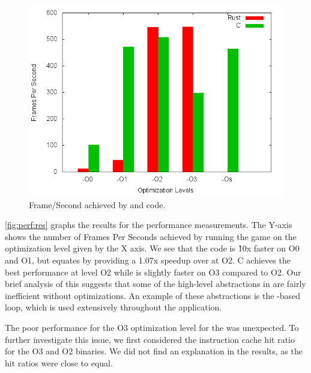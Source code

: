 \begin{figure}[H]
  \begin{center}
    \includegraphics[scale=0.5]{results/plots/perf/perf.png}
  \end{center}
  \caption{Frame/Second achieved by {\rust} and {\C} code.}
  \label{fig:perf:res}
\end{figure}

\autoref{fig:perf:res} graphs the results for the performance measurements.
The Y-axis shows the number of Frames Per Seconds achieved by running the game on the optimization level given by the X axis.
We see that the {\C} code is \~10x faster on O0 and O1, but {\rust} equates by providing a 1.07x speedup over {\C} at O2.
C achieves the best performance at level O2 while {\rust} is slightly faster on O3 compared to O2.
Our brief analysis of this suggests that some of the high-level abstractions in {\rust} are fairly inefficient without optimizations.
An example of these abstractions is the -based  loop, which is used extensively throughout the {\cg} application.

The poor performance for the O3 optimization level for the {\C} was unexpected.
To further investigate this issue, we first considered the instruction cache hit ratio for the O3 and O2 binaries.
We did not find an explanation in the results, as the hit ratios were close to equal.

